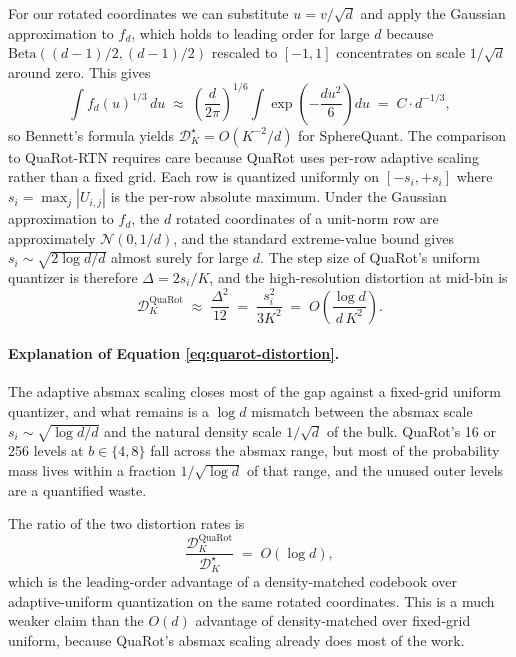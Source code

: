 For our rotated coordinates we can substitute $u = v/\sqrt{d}$ and apply
the Gaussian approximation to $f_d$, which holds to leading order for
large $d$ because $\mathrm{Beta}((d-1)/2, (d-1)/2)$ rescaled to $[-1, 1]$
concentrates on scale $1/\sqrt{d}$ around zero. This gives
\begin{equation}
\int f_d(u)^{1/3}\, du
\;\approx\;
\left(\frac{d}{2\pi}\right)^{1/6} \int \exp\!\left(-\frac{d u^2}{6}\right) du
\;=\;
C \cdot d^{-1/3},
\label{eq:bennett-beta}
\end{equation}
so Bennett's formula yields $\mathcal{D}^\star_K = O(K^{-2}/d)$ for SphereQuant.
The comparison to QuaRot-RTN requires care because QuaRot uses per-row
adaptive scaling rather than a fixed grid. Each row is quantized
uniformly on $[-s_i, +s_i]$ where $s_i = \max_j |U_{i,j}|$ is the per-row
absolute maximum. Under the Gaussian approximation to $f_d$, the $d$
rotated coordinates of a unit-norm row are approximately
$\mathcal{N}(0, 1/d)$, and the standard extreme-value bound gives
$s_i \sim \sqrt{2 \log d / d}$ almost surely for large $d$. The step
size of QuaRot's uniform quantizer is therefore
$\Delta = 2 s_i / K$, and the high-resolution distortion at mid-bin is
\begin{equation}
\mathcal{D}^{\text{QuaRot}}_K
   \;\approx\; \frac{\Delta^2}{12}
   \;=\; \frac{s_i^2}{3 K^2}
   \;=\; O\!\left( \frac{\log d}{d\, K^2} \right).
\label{eq:quarot-distortion}
\end{equation}

\paragraph{Explanation of Equation \ref{eq:quarot-distortion}.}
The adaptive absmax scaling closes most of the gap against a fixed-grid
uniform quantizer, and what remains is a $\log d$ mismatch between the
absmax scale $s_i \sim \sqrt{\log d / d}$ and the natural density scale
$1/\sqrt{d}$ of the bulk. QuaRot's 16 or 256 levels at $b \in \{4, 8\}$
fall across the absmax range, but most of the probability mass lives
within a fraction $1/\sqrt{\log d}$ of that range, and the unused outer
levels are a quantified waste.

The ratio of the two distortion rates is
\begin{equation}
\frac{\mathcal{D}^{\text{QuaRot}}_K}{\mathcal{D}^\star_K}
   \;=\; O(\log d),
\label{eq:ratio-logd}
\end{equation}
which is the leading-order advantage of a density-matched codebook over
adaptive-uniform quantization on the same rotated coordinates. This is a
much weaker claim than the $O(d)$ advantage of density-matched over
fixed-grid uniform, because QuaRot's absmax scaling already does most of
the work.

